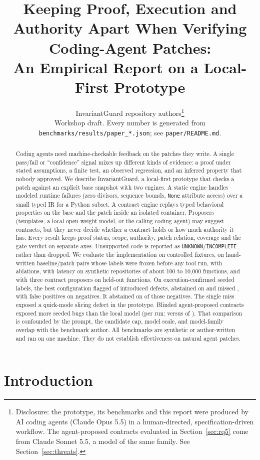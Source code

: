 \documentclass[10pt,twocolumn]{article}
\title{Keeping Proof, Execution and Authority Apart When Verifying Coding-Agent Patches:\\
An Empirical Report on a Local-First Prototype}
\author{InvariantGuard repository authors\thanks{Disclosure: the prototype, its benchmarks and this report were produced by
AI coding agents (Claude Opus 5.5) in a human-directed, specification-driven workflow. The agent-proposed contracts evaluated in
Section~\ref{sec:rq5} come from Claude Sonnet 5.5, a model of the same family. See Section~\ref{sec:threats}.}\\
{\small Workshop draft. Every number is generated from \texttt{benchmarks/results/paper\_*.json}; see \texttt{paper/README.md}.}}
\date{}
\newcommand{\res}[1]{\texttt{\small #1}}
\begin{document}
\maketitle

\begin{abstract}
Coding agents need machine-checkable feedback on the patches they write. A single pass/fail or ``confidence'' signal
mixes up different kinds of evidence: a proof under stated assumptions, a finite test, an observed regression, and an
inferred property that nobody approved. We describe InvariantGuard, a local-first prototype that checks a patch
against an explicit base snapshot with two engines. A static engine handles modeled runtime failures (zero divisors,
sequence bounds, \texttt{None} attribute access) over a small typed IR for a Python subset. A contract engine replays
typed behavioral properties on the base and the patch inside an isolated container. Proposers (templates, a local
open-weight model, or the calling coding agent) may suggest contracts, but they never decide whether a contract holds
or how much authority it has. Every result keeps proof status, scope, authority, patch relation, coverage and the gate
verdict on separate axes. Unsupported code is reported as \res{UNKNOWN}/\res{INCOMPLETE} rather than dropped. We
evaluate the implementation on \SemCases{} controlled fixtures, on \SeedCases{} hand-written baseline/patch pairs whose
labels were frozen before any tool run, with ablations, with latency on synthetic repositories of about 100 to
10{,}000 functions, and with three contract proposers on \ModelFunctions{} held-out functions. On execution-confirmed seeded labels,
the best configuration flagged \SeedBestTP{} of \SeedPos{} introduced defects, abstained on \SeedBestAbstPos{} and
missed \SeedBestFN{}, with \SeedBestFP{} false positives on \SeedNeg{} negatives. It abstained on \SeedBestAbstNeg{} of
those negatives. The single miss exposed a quick-mode slicing defect in the prototype. Blinded agent-proposed contracts
exposed more seeded bugs than the local model (per run: \AgentExposed{} versus \ModelExposed{} of \ModelSeeded{}).
That comparison is confounded by the prompt, the candidate cap, model scale, and model-family overlap with the benchmark author. All
benchmarks are synthetic or author-written and ran on one machine. They do not establish effectiveness on natural agent
patches.
\end{abstract}

\section{Introduction}
\end{document}
